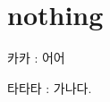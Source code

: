 \hypertarget{page2_nothing}{}\section{nothing}\label{page2_nothing}

\begin{DoxyItemize}
\item 카카 \+: 어어
\item 타타타 \+: 가나다. 
\end{DoxyItemize}